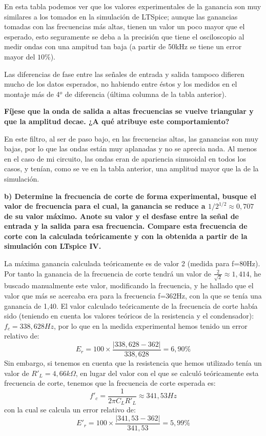 \documentclass{article}
\begin{document}
En esta tabla podemos ver que los valores experimentales de la ganancia son muy similares a los tomados en la simulación de LTSpice; aunque las ganancias tomadas con las frecuencias más altas, tienen un valor un poco mayor que el esperado, esto seguramente se deba a la precisión que tiene el osciloscopio al medir ondas con una ampitud tan baja (a partir de 50kHz se tiene un error mayor del $10\%$).

Las diferencias de fase entre las señales de entrada y salida tampoco difieren mucho de los datos esperados, no habiendo entre éstos y los medidos en el montaje más de 4$^o$ de diferencia (última columna de la tabla anterior).

\textbf{Fíjese que la onda de salida a altas frecuencias se vuelve triangular y que la amplitud decae. ¿A qué atribuye este comportamiento?}

En este filtro, al ser de paso bajo, en las frecuencias altas, las ganancias son muy bajas, por lo que las ondas están muy aplanadas y no se aprecia nada. Al menos en el caso de mi circuito, las ondas eran de apariencia sinusoidal en todos los casos, y tenían, como se ve en la tabla anterior, una amplitud mayor que la de la simulación.
\bigskip

\textbf{b) Determine la frecuencia de corte de forma experimental, busque el valor de frecuencia
para el cual, la ganancia se reduce a $1/2^{1/2}\approx 0,707$ de su valor máximo. Anote su valor
y el desfase entre la señal de entrada y la salida para esa frecuencia. Compare esta
frecuencia de corte con la calculada teóricamente y con la obtenida a partir de la
simulación con LTspice IV.}

La máxima ganancia calculada teóricamente es de valor 2 (medida para f=80Hz). Por tanto la ganancia de la frecuencia de corte tendrá un valor de $ \frac{2}{\sqrt2}\approx 1,414$, he buscado manualmente este valor, modificando la frecuencia, y he hallado que el valor que más se acercaba era para la frecuencia f=362Hz, con la que se tenía una ganancia de 1,40. El valor calculado teóricamente de la frecuencia de corte había sido (teniendo en cuenta los valores teóricos de la resistencia y el condensador): $f_c=338,628Hz$, por lo que en la medida experimental hemos tenido un error relativo de: 
$$E_{r}=100\times \frac{|338,628-362|}{338,628}=6,90\%$$
Sin embargo, si tenemos en cuenta que la resistencia que hemos utilizado tenía un valor de $R'_L=4,66k\Omega$, en lugar del valor con el que se calculó teóricamente esta frecuencia de corte, tenemos que la frecuencia de corte esperada es: 
$$ f'_c=\frac{1}{2\pi C_L R'_L}\approx341,53Hz$$ 
con la cual se calcula un error relativo de: 
$$E'_{r}=100\times \frac{|341,53-362|}{341,53}=5,99\%$$
\end{document}
